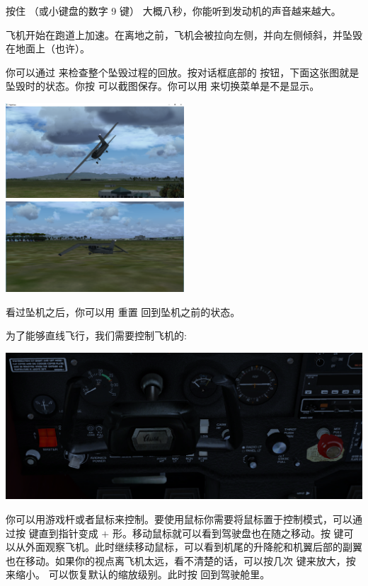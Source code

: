 按住 （或小键盘的数字 9 键） 大概八秒，你能听到发动机的声音越来越大。 

飞机开始在跑道上加速。在离地之前，飞机会被拉向左侧，并向左侧倾斜，并坠毁在地面上（也许）。


你可以通过  来检查整个坠毁过程的回放。按对话框底部的  按钮，下面这张图就是坠毁时的状态。你按  可以截图保存。你可以用  来切换菜单是不是显示。
\medskip

\centerline{
  \includegraphics[width=0.5\textwidth]{img/basic_tutorial/crash}
  \includegraphics[width=0.5\textwidth]{img/basic_tutorial/crash-plunged-to-ground}
}
\medskip

看过坠机之后，你可以用  重置 \FlightGear{} 回到坠机之前的状态。

为了能够直线飞行，我们需要控制飞机的:
\medskip

\centerline{
  \includegraphics[width=\textwidth]{img/basic_tutorial/yoke}
}
\medskip

你可以用游戏杆或者鼠标来控制。要使用鼠标你需要将鼠标置于控制模式，可以通过按  键直到指针变成 $+$ 形。移动鼠标就可以看到驾驶盘也在随之移动。按  键可以从外面观察飞机。此时继续移动鼠标，可以看到机尾的升降舵和机翼后部的副翼也在移动。如果你的视点离飞机太远，看不清楚的话，可以按几次  键来放大，按  来缩小。 可以恢复默认的缩放级别。此时按  回到驾驶舱里。

